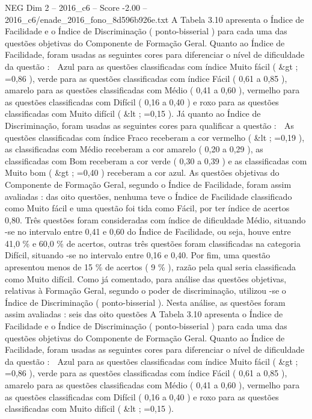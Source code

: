 \begin{textsample}{NEG Dim 2 – 2016\_c6 – Score -2.00 – 2016\_c6/enade\_2016\_fono\_8d596b926e.txt}
A Tabela 3.10 apresenta o Índice de Facilidade e o Índice de Discriminação ( ponto-bisserial ) para cada uma das questões objetivas do Componente de Formação Geral.
Quanto ao Índice de Facilidade, foram usadas as seguintes cores para diferenciar o nível de dificuldade da questão :  Azul para as questões classificadas com índice Muito fácil ( \&gt ; =0,86 ), verde para as questões classificadas com índice Fácil ( 0,61 a 0,85 ), amarelo para as questões classificadas com Médio ( 0,41 a 0,60 ), vermelho para as questões classificadas com Difícil ( 0,16 a 0,40 ) e roxo para as questões classificadas com Muito difícil ( \&lt ; =0,15 ).
Já quanto ao Índice de Discriminação, foram usadas as seguintes cores para qualificar a questão :  As questões classificadas com índice Fraco receberam a cor vermelho ( \&lt ; =0,19 ), as classificadas com Médio receberam a cor amarelo ( 0,20 a 0,29 ), as classificadas com Bom receberam a cor verde ( 0,30 a 0,39 ) e as classificadas com Muito bom ( \&gt ; =0,40 ) receberam a cor azul.
As questões objetivas do Componente de Formação Geral, segundo o Índice de Facilidade, foram assim avaliadas : das oito questões, nenhuma teve o Índice de Facilidade classificado como Muito fácil e uma questão foi tida como Fácil, por ter índice de acertos 0,80.
Três questões foram consideradas com índice de dificuldade Médio, situando -se no intervalo entre 0,41 e 0,60 do Índice de Facilidade, ou seja, houve entre 41,0 \% e 60,0 \% de acertos, outras três questões foram classificadas na categoria Difícil, situando -se no intervalo entre 0,16 e 0,40.
Por fim, uma questão apresentou menos de 15 \% de acertos ( 9 \% ), razão pela qual seria classificada como Muito difícil.
Como já comentado, para análise das questões objetivas, relativas à Formação Geral, segundo o poder de discriminação, utilizou -se o Índice de Discriminação ( ponto-bisserial ).
Nesta análise, as questões foram assim avaliadas : seis das oito questões A Tabela 3.10 apresenta o Índice de Facilidade e o Índice de Discriminação ( ponto-bisserial ) para cada uma das questões objetivas do Componente de Formação Geral.
Quanto ao Índice de Facilidade, foram usadas as seguintes cores para diferenciar o nível de dificuldade da questão :  Azul para as questões classificadas com índice Muito fácil ( \&gt ; =0,86 ), verde para as questões classificadas com índice Fácil ( 0,61 a 0,85 ), amarelo para as questões classificadas com Médio ( 0,41 a 0,60 ), vermelho para as questões classificadas com Difícil ( 0,16 a 0,40 ) e roxo para as questões classificadas com Muito difícil ( \&lt ; =0,15 ).

\end{textsample}
